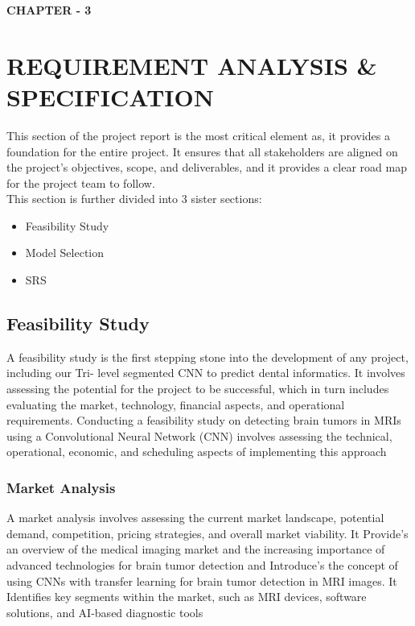\newpage
{}
\begin{center}
    \textbf {\LARGE CHAPTER - 3}
\end{center}
\section{REQUIREMENT ANALYSIS \& SPECIFICATION}

This section of the project report is the most critical element as, it provides a foundation for the entire project. It ensures that all stakeholders are aligned on the project's objectives, scope, and deliverables, and it provides a clear road map for the project team to follow.\\This section is further divided into 3 sister sections:
\begin{itemize}
    \item Feasibility Study
    \item Model Selection
    \item SRS
\end{itemize}

\subsection{Feasibility Study}
 A feasibility study is the first stepping stone into the development of any project, including our Tri-
level segmented CNN to predict dental informatics. It involves assessing the potential for the project
to be successful, which in turn includes evaluating the market, technology, financial aspects, and
operational requirements. Conducting a feasibility study on detecting brain tumors in MRIs using a Convolutional Neural Network (CNN) involves assessing the technical, operational, economic, and scheduling aspects of implementing this approach
 
\subsubsection{Market Analysis}
A market analysis involves assessing the current market landscape, potential demand, competition, pricing strategies, and overall market viability. It Provide's an overview of the medical imaging market and the increasing importance of advanced technologies for brain tumor detection and Introduce's the concept of using CNNs with transfer learning for brain tumor detection in MRI images. It Identifies key segments within the market, such as MRI devices, software solutions, and AI-based diagnostic tools
